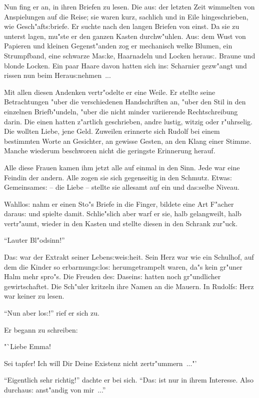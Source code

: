 \documentclass[oneside,12pt]{book}
\newcommand{\s}{s:}%
\begin{document}
Nun fing er an, in ihren Briefen zu lesen. Die au{\s} der letzten
Zeit wimmelten von Anspielungen auf die Reise; sie waren kurz,
sachlich und in Eile hingeschrieben, wie Gesch"aft{\s}briefe. Er
suchte nach den langen Briefen von einst. Da sie zu unterst lagen,
mu"ste er den ganzen Kasten durchw"uhlen. Au{\s} dem Wust von
Papieren und kleinen Gegenst"anden zog er mechanisch welke Blumen,
ein Strumpfband, eine schwarze Ma{\s}ke, Haarnadeln und Locken
herau{\s}. Braune und blonde Locken. Ein paar Haare davon hatten
sich in{\s} Scharnier gezw"angt und rissen nun beim
Herau{\s}nehmen~...

Mit allen diesen Andenken vertr"odelte er eine Weile. Er stellte
seine Betrachtungen "uber die verschiedenen Handschriften an,
"uber den Stil in den einzelnen Briefb"undeln, "uber die nicht
minder variierende Rechtschreibung darin. Die einen hatten
z"artlich geschrieben, andre lustig, witzig oder r"uhrselig. Die
wollten Liebe, jene Geld. Zuweilen erinnerte sich Rudolf bei einem
bestimmten Worte an Gesichter, an gewisse Gesten, an den Klang
einer Stimme. Manche wiederum beschworen nicht die geringste
Erinnerung herauf.

Alle diese Frauen kamen ihm jetzt alle auf einmal in den Sinn.
Jede war eine Feindin der andern. Alle zogen sie sich gegenseitig
in den Schmutz. Etwa{\s} Gemeinsame{\s} -- die Liebe -- stellte
sie allesamt auf ein und da{\s}selbe Niveau.

Wahllo{\s} nahm er einen Sto"s Briefe in die Finger, bildete eine
Art F"acher darau{\s} und spielte damit. Schlie"slich aber warf er
sie, halb gelangweilt, halb vertr"aumt, wieder in den Kasten und
stellte diesen in den Schrank zur"uck.

"`Lauter Bl"odsinn!"'

Da{\s} war der Extrakt seiner Leben{\s}wei{\s}heit. Sein Herz war
wie ein Schulhof, auf dem die Kinder so erbarmung{\s}lo{\s}
herumgetrampelt waren, da"s kein gr"uner Halm mehr spro"s. Die
Freuden de{\s} Dasein{\s} hatten noch gr"undlicher gewirtschaftet.
Die Sch"uler kritzeln ihre Namen an die Mauern. In Rudolf{\s} Herz
war keiner zu lesen.

"`Nun aber lo{\s}!"' rief er sich zu.

Er begann zu schreiben:

"`Liebe Emma!

Sei tapfer! Ich will Dir Deine Existenz nicht zertr"ummern~..."'

"`Eigentlich sehr richtig!"' dachte er bei sich. "`Da{\s} ist nur
in ihrem Interesse. Also durchau{\s} anst"andig von mir~..."'
\end{document}
